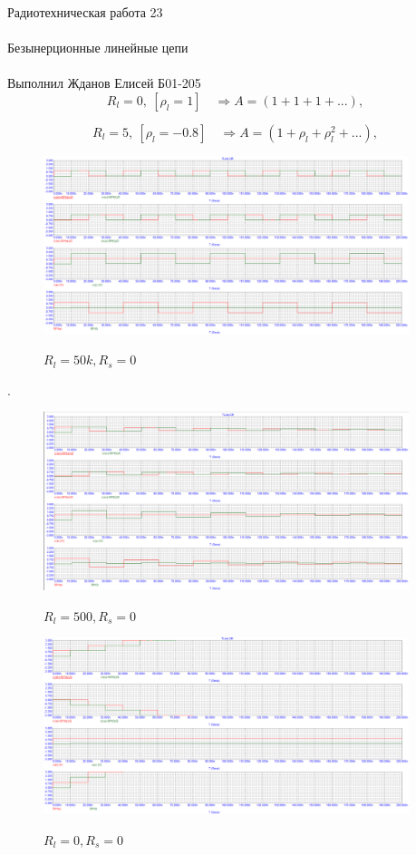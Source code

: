 \documentclass{astroedu-lab}
\begin{document}
\begin{problem}{\huge Радиотехническая работа 23\\\\Безынерционные линейные цепи\\\\Выполнил Жданов Елисей Б01-205}
\[R_l = 0, \: [\rho_l = 1] \quad \Rightarrow A = (1 +1 +1 +...),\]

\[R_l = 5, \: [\rho_l = -0.8] \quad \Rightarrow A = (1 +\rho_l + \rho_l^2 +...),\]

\begin{figure}[h!]
\centering
\includegraphics[width=0.95\textwidth]{картинки/Graph11.png}
\label{fig:Image1}
\caption{$R_l = 50k, R_s = 0$}
\end{figure}

.

\begin{figure}[h!]
\centering
\includegraphics[width=0.95\textwidth]{картинки/Graph12.png}
\label{fig:Image1}
\caption{$R_l = 500, R_s = 0$}
\end{figure}

\newpage

\begin{figure}[h!]
\centering
\includegraphics[width=0.95\textwidth]{картинки/Graph13.png}
\label{fig:Image1}
\caption{$R_l = 0, R_s = 0$}
\end{figure}


\end{problem}
\end{document}
